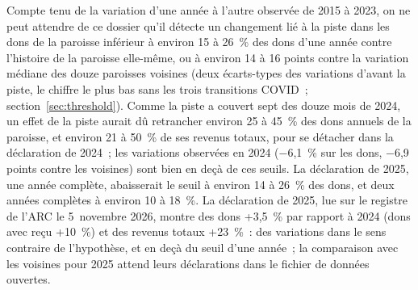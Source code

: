 Compte tenu de la variation d'une année à l'autre observée de 2015 à 2023, on ne peut attendre de ce dossier qu'il détecte un changement lié à la piste dans les dons de la paroisse inférieur à environ 15 à 26~\% des dons d'une année contre l'histoire de la paroisse elle-même, ou à environ 14 à 16 points contre la variation médiane des douze paroisses voisines (deux écarts-types des variations d'avant la piste, le chiffre le plus bas sans les trois transitions COVID~; section~\ref{sec:threshold}). Comme la piste a couvert sept des douze mois de 2024, un effet de la piste aurait dû retrancher environ 25 à 45~\% des dons annuels de la paroisse, et environ 21 à 50~\% de ses revenus totaux, pour se détacher dans la déclaration de 2024~; les variations observées en 2024 ($-$6,1~\% sur les dons, $-$6,9 points contre les voisines) sont bien en deçà de ces seuils. La déclaration de 2025, une année complète, abaisserait le seuil à environ 14 à 26~\% des dons, et deux années complètes à environ 10 à 18~\%. La déclaration de 2025, lue sur le registre de l'ARC le 5~novembre 2026, montre des dons +3,5~\% par rapport à 2024 (dons avec reçu +10~\%) et des revenus totaux +23~\%~: des variations dans le sens contraire de l'hypothèse, et en deçà du seuil d'une année~; la comparaison avec les voisines pour 2025 attend leurs déclarations dans le fichier de données ouvertes.

